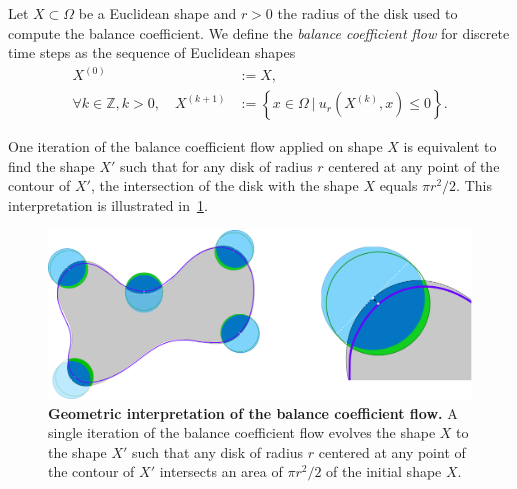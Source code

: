 \documentclass[review]{siamart220329}
\newcommand{\Z}{\mathbb{Z}}
\begin{document}
\begin{definition}
  Let $X \subset \Omega$ be a Euclidean shape and $r>0$ the radius of the disk used to compute the balance coefficient. We define the \emph{balance coefficient flow} for discrete time steps as the sequence of Euclidean shapes
%
%
\begin{align}
  X^{(0)} & := X, \nonumber \\
  \forall k \in \Z, k > 0, \quad X^{(k+1)} & := \left\{ x \in \Omega \: | \: u_r(X^{(k)}, x) \leq 0 \right\}. \label{eq-balance-coefficient-flow}
\end{align}
%
%
\end{definition}
%
%
 One iteration of the balance coefficient flow applied on shape $X$ is equivalent to find the shape $X'$ such that for any disk of radius $r$ centered at any point of the contour of $X'$, the intersection of the disk with the shape $X$ equals $\pi r^2/2$. This interpretation is illustrated in~\cref{fig:geometric-interpretation}.
%
% 
\begin{figure}
\center
\includegraphics[scale=0.25]{figures/zero-level-set/geometric-interpretation.png}
\caption{\textbf{Geometric interpretation of the balance coefficient flow.} A single iteration of the balance coefficient flow evolves the shape $X$ to the shape $X'$ such that any disk of radius $r$ centered at any point of the contour of $X'$ intersects  an area of $\pi r^2/2$ of the initial shape $X$.}
\label{fig:geometric-interpretation}
\end{figure}
% 
%
\end{document}
